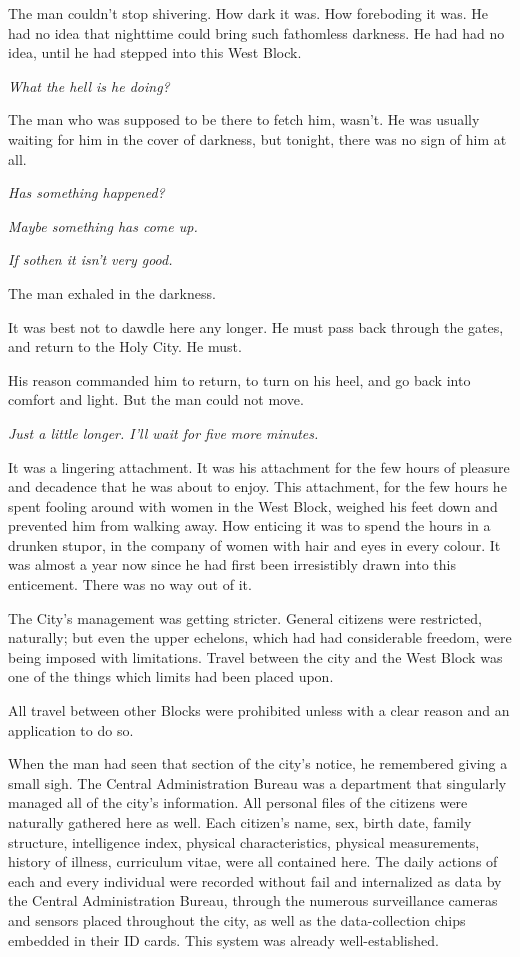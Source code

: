 The man couldn't stop shivering. How dark it was. How foreboding it was.
He had no idea that nighttime could bring such fathomless darkness. He
had had no idea, until he had stepped into this West Block.

\emph{What the hell is he doing?}

The man who was supposed to be there to fetch him, wasn't. He was
usually waiting for him in the cover of darkness, but tonight, there was
no sign of him at all.

\emph{Has something happened?}

\emph{Maybe something has come up.}

\emph{If so\el then it isn't very good.}

The man exhaled in the darkness.

It was best not to dawdle here any longer. He must pass back through the
gates, and return to the Holy City. He must.

His reason commanded him to return, to turn on his heel, and go back
into comfort and light. But the man could not move.

\emph{Just a little longer. I'll wait for five more minutes.}

It was a lingering attachment. It was his attachment for the few hours
of pleasure and decadence that he was about to enjoy. This attachment,
for the few hours he spent fooling around with women in the West Block,
weighed his feet down and prevented him from walking away. How enticing
it was to spend the hours in a drunken stupor, in the company of women
with hair and eyes in every colour. It was almost a year now since he
had first been irresistibly drawn into this enticement. There was no way
out of it.

The City's management was getting stricter. General citizens were
restricted, naturally; but even the upper echelons, which had had
considerable freedom, were being imposed with limitations. Travel
between the city and the West Block was one of the things which limits
had been placed upon.

All travel between other Blocks were prohibited unless with a clear
reason and an application to do so.

When the man had seen that section of the city's notice, he remembered
giving a small sigh. The Central Administration Bureau was a department
that singularly managed all of the city's information. All personal
files of the citizens were naturally gathered here as well. Each
citizen's name, sex, birth date, family structure, intelligence index,
physical characteristics, physical measurements, history of illness,
curriculum vitae, were all contained here. The daily actions of each and
every individual were recorded without fail and internalized as data by
the Central Administration Bureau, through the numerous surveillance
cameras and sensors placed throughout the city, as well as the
data-collection chips embedded in their ID cards. This system was
already well-established.

